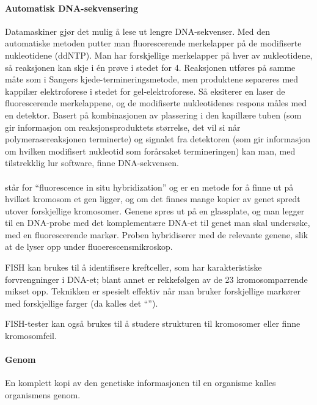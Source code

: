 \paragraph{Automatisk DNA-sekvensering} Datamaskiner gjør det mulig å lese ut lengre DNA-sekvenser. Med den automatiske metoden putter man fluorescerende merkelapper på de modifiserte nukleotidene (ddNTP). Man har forskjellige merkelapper på hver av nukleotidene, så reaksjonen kan skje i én prøve i stedet for 4. Reaksjonen utføres på samme måte som i Sangers kjede-termineringsmetode, men produktene separeres med kappilær elektroforese i stedet for gel-elektroforese. Så eksiterer en laser de fluorescerende merkelappene, og de modifiserte nukleotidenes respons måles med en detektor. Basert på kombinasjonen av plassering i den kapillære tuben (som gir informasjon om reaksjonsproduktets størrelse, det vil si når polymerasereaksjonen terminerte) og signalet fra detektoren (som gir informasjon om hvilken modifisert nukleotid som forårsaket termineringen) kan man, med tilstrekklig lur software, finne DNA-sekvensen.

\paragraph{} står for ``fluorescence in situ hybridization'' og er en metode for å finne ut på hvilket kromosom et gen ligger, og om det finnes mange kopier av genet spredt utover forskjellige kromosomer. Genene spres ut på en glassplate, og man legger til en DNA-probe med det komplementære DNA-et til genet man skal undersøke, med en fluorescerende markør. Proben hybridiserer med de relevante genene, slik at de lyser opp under fluoerescensmikroskop. 

FISH kan brukes til å identifisere kreftceller, som har karakteristiske forvrengninger i DNA-et; blant annet er rekkefølgen av de 23 kromosomparrende mikset opp. Teknikken er spesielt effektiv når man bruker forskjellige markører med forskjellige farger (da kalles det ``'').

FISH-tester kan også brukes til å studere strukturen til kromosomer eller finne kromosomfeil.


\paragraph{Genom} En komplett kopi av den genetiske informasjonen til en organisme kalles organismens genom.

